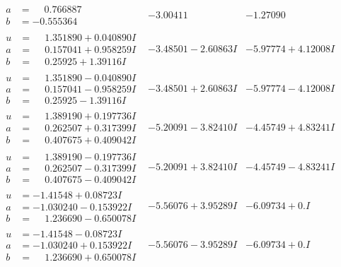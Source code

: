 \documentclass[1p]{elsarticle_modified}
\theoremstyle{definition}
\begin{document}
$$\begin{array}{c|c|c}
\begin{aligned}
a &= \phantom{-}0.766887\phantom{ +0.000000I} \\
b &= -0.555364\phantom{ +0.000000I}\end{aligned}
 & -3.00411\phantom{ +0.000000I} & -1.27090\phantom{ +0.000000I} \\ \hline\begin{aligned}
u &= \phantom{-}1.351890 + 0.040890 I \\
a &= \phantom{-}0.157041 + 0.958259 I \\
b &= \phantom{-}0.25925 + 1.39116 I\end{aligned}
 & -3.48501 - 2.60863 I & -5.97774 + 4.12008 I \\ \hline\begin{aligned}
u &= \phantom{-}1.351890 - 0.040890 I \\
a &= \phantom{-}0.157041 - 0.958259 I \\
b &= \phantom{-}0.25925 - 1.39116 I\end{aligned}
 & -3.48501 + 2.60863 I & -5.97774 - 4.12008 I \\ \hline\begin{aligned}
u &= \phantom{-}1.389190 + 0.197736 I \\
a &= \phantom{-}0.262507 + 0.317399 I \\
b &= \phantom{-}0.407675 + 0.409042 I\end{aligned}
 & -5.20091 - 3.82410 I & -4.45749 + 4.83241 I \\ \hline\begin{aligned}
u &= \phantom{-}1.389190 - 0.197736 I \\
a &= \phantom{-}0.262507 - 0.317399 I \\
b &= \phantom{-}0.407675 - 0.409042 I\end{aligned}
 & -5.20091 + 3.82410 I & -4.45749 - 4.83241 I \\ \hline\begin{aligned}
u &= -1.41548 + 0.08723 I \\
a &= -1.030240 - 0.153922 I \\
b &= \phantom{-}1.236690 - 0.650078 I\end{aligned}
 & -5.56076 + 3.95289 I & -6.09734 + 0. I\phantom{ +0.000000I} \\ \hline\begin{aligned}
u &= -1.41548 - 0.08723 I \\
a &= -1.030240 + 0.153922 I \\
b &= \phantom{-}1.236690 + 0.650078 I\end{aligned}
 & -5.56076 - 3.95289 I & -6.09734 + 0. I\phantom{ +0.000000I} \\ \hline\begin{aligned}

\end{aligned}
\end{array}$$
\end{document}
